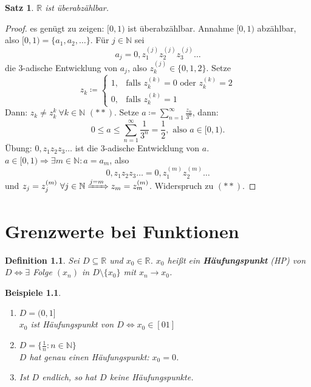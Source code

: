 \documentclass{extreport}
\newcommand{\N}{\mathbb{N}}
\newcommand{\R}{\mathbb{R}}
\theoremstyle{named}
\theoremstyle{dotless}
\newtheorem{satz}[namedtheorem]{Satz}
\newtheorem*{beispiele}{Beispiele}
\newtheorem*{definition}{Definition}
\begin{document}
\begin{satz} \label{5.3:satz}
	$\R$ ist überabzählbar.
\end{satz}

\begin{proof}
	es genügt zu zeigen: $[0, 1)$ ist überabzählbar. Annahme $[0, 1)$ abzählbar, also $[0, 1) = \{ a_{1}, a_{2}, \dotsc \}$. Für $j \in \N$ sei
		$$ a_{j} = 0, z_{1}^{(j)} z_{2}^{(j)} z_{3}^{(j)} \dotsc $$
	die 3-adische Entwicklung von $a_{j}$, also $z_{k}^{(j)} \in \{ 0, 1, 2 \}$. Setze
		$$ z_{k} \coloneqq \begin{cases} 1, & \text{falls } z_{k}^{(k)} = 0 \text{ oder } z_{k}^{(k)} = 2 \\ 0, & \text{falls } z_{k}^{(k)} = 1 \end{cases} $$
	Dann: $z_{k} \neq z_{k}^{k} ~\forall k \in \N$ $(**)$. Setze $a \coloneqq \sum_{n=1}^{\infty} \frac{z_{n}}{3^{n}}$, dann:
		$$ 0 \leq a \leq \sum_{n=1}^{\infty} \frac{1}{3^{n}} = \frac{1}{2}, \text{ also } a \in [0, 1). $$
	Übung: $0, z_{1} z_{2} z_{3} \dotsc$ ist die 3-adische Entwicklung von $a$.$a \in [0, 1) \Rightarrow \exists m \in \N: a = a_{m}$, also
		$$ 0, z_{1} z_{2} z_{3} \dotsc = 0, z_{1}^{(m)} z_{2}^{(m)} \dotsc $$
	und $z_{j} = z_{j}^{(m)} ~\forall j \in \N \xRightarrow[]{j = m} z_{m} = z_{m}^{(m)}$. Widerspruch zu $(**)$.
\end{proof}


\newpage


\chapter{Grenzwerte bei Funktionen}

\begin{definition}
	Sei $D \subseteq \R$ und $x_{0} \in \R$. $x_{0}$ hei{\ss}t ein \textbf{Häufungspunkt} (HP) von $D \iff \exists$ Folge $(x_{n})$ in $D \setminus \{ x_{0} \}$ mit $x_{n} \rightarrow x_{0}$.
\end{definition}


\begin{beispiele}
	\begin{enumerate}
		\item $D = (0, 1]$ \\ %
			$x_{0}$ ist Häufungspunkt von $D \iff x_{0} \in [0 1]$
		\item $D = \{ \frac{1}{n} : n \in \N \}$ \\ %
			$D$ hat genau einen Häufungspunkt: $x_{0} = 0$.
		\item Ist $D$ endlich, so hat $D$ keine Häufungspunkte. 
	\end{enumerate}	
\end{beispiele}
\end{document}
